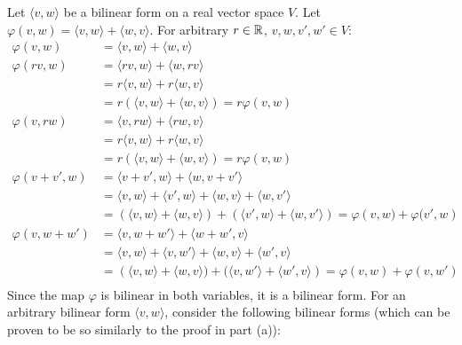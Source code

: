 \documentclass{article}
\begin{document}
Let $\langle v, w\rangle$ be a bilinear form on a real vector space $V$. Let $\varphi\left(v,  w\right) = \langle v, w \rangle + \langle w, v \rangle$. For arbitrary $r \in \mathbb{R}$, $v, w, v', w' \in V$:
\begin{equation}
    \begin{split}
        \varphi\left(v, w\right) & = \langle v, w \rangle + \langle w, v \rangle \\
        \varphi\left(rv, w\right) & = \langle rv, w \rangle + \langle w, rv \rangle \\
        & = r\langle v, w \rangle + r\langle w, v \rangle \\
        & = r\left(\langle  v, w \rangle + \langle w, v  \rangle\right) = r\varphi\left(v, w\right) \\
        \varphi\left(v, rw\right) & = \langle v, rw \rangle + \langle rw, v \rangle \\
        & = r\langle v, w \rangle + r\langle w, v \rangle \\
        & = r\left(\langle  v, w \rangle + \langle w, v  \rangle\right) = r\varphi\left(v, w\right) \\
        \varphi\left(v + v', w\right) & = \langle v + v', w \rangle + \langle w, v + v' \rangle \\
        & = \langle v, w \rangle + \langle v', w \rangle + \langle w, v \rangle + \langle w, v' \rangle \\
        & = \left(\langle  v, w \rangle + \langle w, v \rangle\right) + \left(\langle v', w \rangle + \langle w, v'  \rangle\right) = \varphi\left(v,  w) + \varphi(v', w\right) \\
        \varphi\left(v, w + w'\right) & = \langle v, w + w' \rangle + \langle w + w', v \rangle \\
        & = \langle v, w \rangle + \langle v, w' \rangle + \langle w, v \rangle + \langle w', v \rangle \\
        & = \left(\langle  v, w \rangle + \langle w, v \rangle) + (\langle v, w' \rangle + \langle w', v  \rangle\right) = \varphi\left(v,  w\right) + \varphi\left(v, w'\right) \\
    \end{split}
\end{equation}
Since the map $\varphi$ is bilinear in both variables, it is a bilinear form.
For an arbitrary bilinear form $\langle v, w \rangle$, consider the following bilinear forms (which can be proven to be so similarly to the proof in part (a)):
\end{document}
